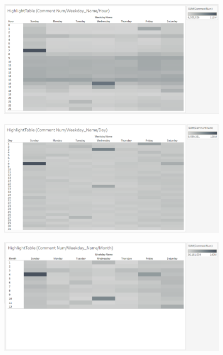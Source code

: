 \documentclass[submit,techrep,noauthor]{ipsj}
\begin{document}
\begin{figure}[h]
  \hspace{-1.0zh}
  \begin{minipage}[b]{0.49\columnwidth}
    \centering
    \includegraphics[width=\columnwidth]{./eps/HighlightTable_CommentNum_WeekdayNameHour.eps}
    \label{fig:highlighttable_comment_num_weekdaynameHour}
  \end{minipage}
  \begin{minipage}[b]{0.49\columnwidth}
    \centering
    \includegraphics[width=\columnwidth]{./eps/HighlightTable_CommentNum_WeekdayNameDay.eps}
    \label{fig:highlighttable_comment_num_weekdaynameDay}
  \end{minipage}
  \begin{minipage}[b]{0.49\columnwidth}
    \centering
    \includegraphics[width=\columnwidth]{./eps/HighlightTable_CommentNum_WeekdayNameMonth.eps}

\end{minipage}
\end{figure}
\end{document}
